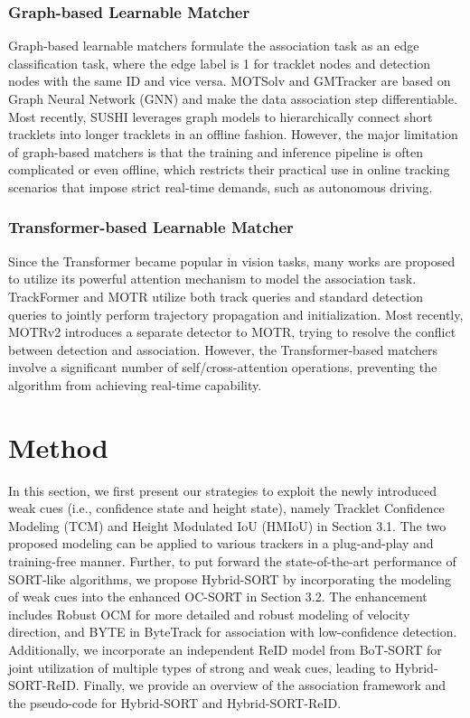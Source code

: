\documentclass[letterpaper]{article} \usepackage{aaai23}  \usepackage{times}  \usepackage{helvet}  \usepackage{courier}  \usepackage[hyphens]{url}  \usepackage{graphicx} \urlstyle{rm} \def\UrlFont{\rm}  \usepackage{natbib}  \usepackage{caption} \frenchspacing  \setlength{\pdfpagewidth}{8.5in}  \setlength{\pdfpageheight}{11in}  \usepackage{algorithm}
\begin{document}
\subsubsection{Graph-based Learnable Matcher}
Graph-based learnable matchers formulate the association task as an edge classification task, where the edge label is 1 for tracklet nodes and detection nodes with the same ID and vice versa. MOTSolv \textcolor{blue}{\cite{braso2020learning}} and GMTracker \textcolor{blue}{\cite{he2021learnable}} are based on Graph Neural Network (GNN) and make the data association step differentiable.  Most recently, SUSHI \textcolor{blue}{\cite{cetintas2023unifying}} leverages graph models to hierarchically connect short tracklets into longer tracklets in an offline fashion. However, the major limitation of graph-based matchers is that the training and inference pipeline is often complicated or even offline, which restricts their practical use in online tracking scenarios that impose strict real-time demands, such as autonomous driving. 

\subsubsection{Transformer-based Learnable Matcher}
Since the Transformer became popular in vision tasks, many works are proposed to utilize its powerful attention mechanism to model the association task. TrackFormer \textcolor{blue}{\cite{meinhardt2022trackformer}} and MOTR \textcolor{blue}{\cite{zeng2022motr}} utilize both track queries and standard detection queries to jointly perform trajectory propagation and initialization. Most recently, MOTRv2 \textcolor{blue}{\cite{zhang2023motrv2}} introduces a separate detector to MOTR, trying to resolve the conflict between detection and association. However, the Transformer-based matchers involve a significant number of self/cross-attention operations, preventing the algorithm from achieving real-time capability. 



\section{Method}
In this section, we first present our strategies to exploit the newly introduced weak cues (i.e., confidence state and height state), namely Tracklet Confidence Modeling (TCM) and Height Modulated IoU (HMIoU) in Section 3.1. The two proposed modeling can be applied to various trackers in a plug-and-play and training-free manner. Further, to put forward the state-of-the-art performance of SORT-like algorithms, we propose Hybrid-SORT by incorporating the modeling of weak cues into the enhanced OC-SORT in Section 3.2. The enhancement includes Robust OCM for more detailed and robust modeling of velocity direction, and BYTE in ByteTrack \textcolor{blue}{\cite{zhang2022bytetrack}} for association with low-confidence detection. Additionally, we incorporate an independent ReID model from BoT-SORT \textcolor{blue}{\cite{aharon2022bot}} for joint utilization of multiple types of strong and weak cues, leading to Hybrid-SORT-ReID. Finally, we provide an overview of the association framework and the pseudo-code for Hybrid-SORT and Hybrid-SORT-ReID.
\end{document}
